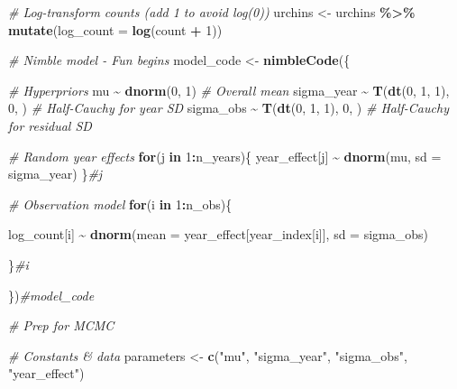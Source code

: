 \documentclass[
]{article}
\newenvironment{Shaded}{\begin{snugshade}}{\end{snugshade}}
\newcommand{\AttributeTok}[1]{\textcolor[rgb]{0.13,0.29,0.53}{#1}}
\newcommand{\CommentTok}[1]{\textcolor[rgb]{0.56,0.35,0.01}{\textit{#1}}}
\newcommand{\ControlFlowTok}[1]{\textcolor[rgb]{0.13,0.29,0.53}{\textbf{#1}}}
\newcommand{\DecValTok}[1]{\textcolor[rgb]{0.00,0.00,0.81}{#1}}
\newcommand{\FunctionTok}[1]{\textcolor[rgb]{0.13,0.29,0.53}{\textbf{#1}}}
\newcommand{\NormalTok}[1]{#1}
\newcommand{\OtherTok}[1]{\textcolor[rgb]{0.56,0.35,0.01}{#1}}
\newcommand{\SpecialCharTok}[1]{\textcolor[rgb]{0.81,0.36,0.00}{\textbf{#1}}}
\newcommand{\StringTok}[1]{\textcolor[rgb]{0.31,0.60,0.02}{#1}}
\begin{document}
\begin{Shaded}
\begin{Highlighting}[]
\CommentTok{\# Log{-}transform counts (add 1 to avoid log(0))}
\NormalTok{urchins }\OtherTok{\textless{}{-}}\NormalTok{ urchins }\SpecialCharTok{\%\textgreater{}\%}
  \FunctionTok{mutate}\NormalTok{(}\AttributeTok{log\_count =} \FunctionTok{log}\NormalTok{(count }\SpecialCharTok{+} \DecValTok{1}\NormalTok{))}



\CommentTok{\# Nimble model {-} Fun begins}
\NormalTok{model\_code }\OtherTok{\textless{}{-}} \FunctionTok{nimbleCode}\NormalTok{(\{}
  
  \CommentTok{\# Hyperpriors}
\NormalTok{  mu         }\SpecialCharTok{\textasciitilde{}} \FunctionTok{dnorm}\NormalTok{(}\DecValTok{0}\NormalTok{, }\DecValTok{1}\NormalTok{)           }\CommentTok{\# Overall mean}
\NormalTok{  sigma\_year }\SpecialCharTok{\textasciitilde{}} \FunctionTok{T}\NormalTok{(}\FunctionTok{dt}\NormalTok{(}\DecValTok{0}\NormalTok{, }\DecValTok{1}\NormalTok{, }\DecValTok{1}\NormalTok{), }\DecValTok{0}\NormalTok{, )   }\CommentTok{\# Half{-}Cauchy for year SD}
\NormalTok{  sigma\_obs  }\SpecialCharTok{\textasciitilde{}} \FunctionTok{T}\NormalTok{(}\FunctionTok{dt}\NormalTok{(}\DecValTok{0}\NormalTok{, }\DecValTok{1}\NormalTok{, }\DecValTok{1}\NormalTok{), }\DecValTok{0}\NormalTok{, )   }\CommentTok{\# Half{-}Cauchy for residual SD}
  
  \CommentTok{\# Random year effects}
  \ControlFlowTok{for}\NormalTok{(j }\ControlFlowTok{in} \DecValTok{1}\SpecialCharTok{:}\NormalTok{n\_years)\{}
\NormalTok{    year\_effect[j] }\SpecialCharTok{\textasciitilde{}} \FunctionTok{dnorm}\NormalTok{(mu, }\AttributeTok{sd =}\NormalTok{ sigma\_year)}
\NormalTok{  \}}\CommentTok{\#j}
  
  \CommentTok{\# Observation model}
  \ControlFlowTok{for}\NormalTok{(i }\ControlFlowTok{in} \DecValTok{1}\SpecialCharTok{:}\NormalTok{n\_obs)\{}
    
\NormalTok{    log\_count[i] }\SpecialCharTok{\textasciitilde{}} \FunctionTok{dnorm}\NormalTok{(}\AttributeTok{mean =}\NormalTok{ year\_effect[year\_index[i]], }\AttributeTok{sd =}\NormalTok{ sigma\_obs)}
    
\NormalTok{  \}}\CommentTok{\#i}
  
\NormalTok{\})}\CommentTok{\#model\_code}


\CommentTok{\# Prep for MCMC}

\CommentTok{\# Constants \& data}
\NormalTok{parameters }\OtherTok{\textless{}{-}} \FunctionTok{c}\NormalTok{(}\StringTok{"mu"}\NormalTok{, }\StringTok{"sigma\_year"}\NormalTok{, }\StringTok{"sigma\_obs"}\NormalTok{, }\StringTok{"year\_effect"}\NormalTok{)}


\end{Highlighting}
\end{Shaded}
\end{document}
